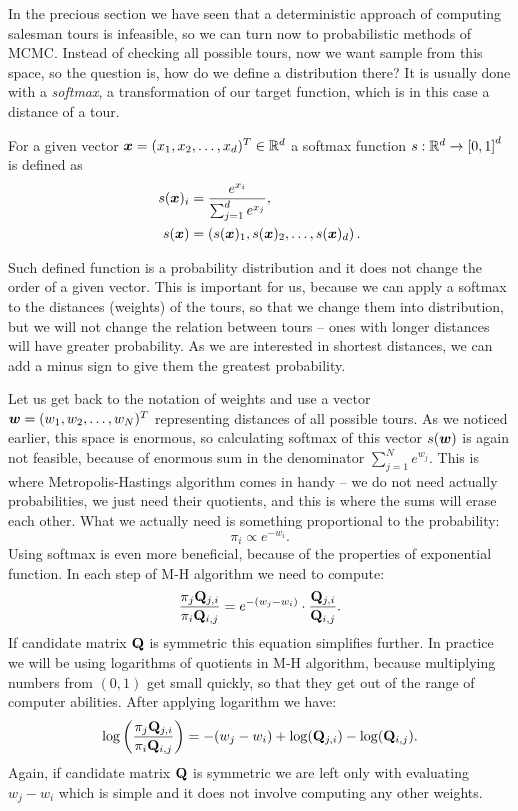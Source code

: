 In the precious section we have seen that a deterministic approach of computing salesman tours is infeasible, so we can turn now to probabilistic methods of MCMC. Instead of checking all possible tours, now we want sample from this space, so the question is, how do we define a distribution there? It is usually done with a \textit{softmax}, a transformation of our target function, which is in this case a distance of a tour.

\begin{definition}
	For a given vector $\bm{x} = (x_1, x_2, \ldots, x_d)^T \in \mathbb{R}^d$ a softmax function $s: \mathbb{R}^d \rightarrow \left[0, 1\right]^d$ is defined as
	\begin{align*}
		s(\bm{x})_i &= \frac{e^{x_i}}{\sum_{j=1}^{d} e^{x_j}}, \\
		s(\bm{x}) &= \left( s(\bm{x})_1, s(\bm{x})_2, \ldots, s(\bm{x})_d \right).
	\end{align*}
\end{definition}
Such defined function is a probability distribution and it does not change the order of a given vector. This is important for us, because we can apply a softmax to the distances (weights) of the tours, so that we change them into distribution, but we will not change the relation between tours -- ones with longer distances will have greater probability. As we are interested in shortest distances, we can add a minus sign to give them the greatest probability.

Let us get back to the notation of weights and use a vector $\bm{w} = (w_1, w_2, \ldots, w_N)^T$ representing distances of all possible tours. As we noticed earlier, this space is enormous, so calculating softmax of this vector $s(\bm{w})$ is again not feasible, because of enormous sum in the denominator $\sum_{j=1}^{N} e^{w_j}$. This is where Metropolis-Hastings algorithm comes in handy -- we do not need actually probabilities, we just need their quotients, and this is where the sums will erase each other. What we actually need is something proportional to the probability:
\begin{equation*}
	\pi_i \propto e^{-w_i}.
\end{equation*}
Using softmax is even more beneficial, because of the properties of exponential function. In each step of M-H algorithm we need to compute:
\begin{equation*}
	\frac{\pi_j \mathbf{Q}_{j,i}}{\pi_i \mathbf{Q}_{i,j}} = e^{-(w_j-w_i)} \cdot \frac{\mathbf{Q}_{j,i}}{\mathbf{Q}_{i,j}}.
\end{equation*}
If candidate matrix $\mathbf{Q}$ is symmetric this equation simplifies further. In practice we will be using logarithms of quotients in M-H algorithm, because multiplying numbers from $(0,1)$ get small quickly, so that they get out of the range of computer abilities. After applying logarithm we have:
\begin{equation*}
	\log \left( \frac{\pi_j \mathbf{Q}_{j,i}}{\pi_i \mathbf{Q}_{i,j}} \right) = -(w_j-w_i) + \log(\mathbf{Q}_{j,i}) - \log(\mathbf{Q}_{i,j}).
\end{equation*}
Again, if candidate matrix $\mathbf{Q}$ is symmetric we are left only with evaluating $w_j-w_i$ which is simple and it does not involve computing any other weights.

